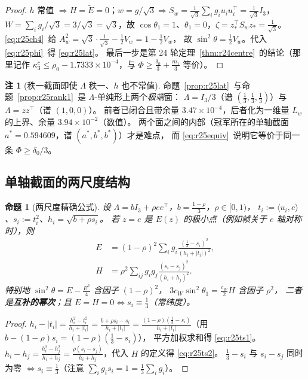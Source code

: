 \documentclass[UTF8,11pt]{ctexart}
\newtheorem{proposition}[theorem]{命题}
\theoremstyle{definition}
\newtheorem{remark}[theorem]{注}
\newcommand{\Lam}{\Lambda}
\begin{document}
\begin{proof}
$h$ 常值 $\Rightarrow H=\widetilde E=0$；$w=g/\sqrt3\Rightarrow S_w=\frac1{\sqrt3}\sum_ig_iu_iu_i^\top=\frac1{\sqrt3}I_3$，
$W=\sum_ig_i/\sqrt3=3/\sqrt3=\sqrt3$，故 $\cos\theta_1=1$、$\theta_1=0$，$\zeta=z_*^\top S_wz_*=\frac1{\sqrt3}$。
\eqref{eq:r25ch4}~给 $A_w^2=\sqrt3\cdot\frac1{\sqrt3}-\frac12V_w=1-\frac12V_w$，
故 $\sin^2\theta=\frac12V_w$。代入 \eqref{eq:r25phi}~得 \eqref{eq:r25lat}。
最后一步是第 24 轮定理~\ref{thm:r24centre}~的结论（那里记作
$\kappa_3^c\le\rho_0-1.7333\times10^{-4}$，与 $\Phi\ge\frac{\delta_0}3+\frac{m_1}3$ 等价）。
\end{proof}

\begin{remark}[秩一截面即使 $\Lam$ 秩一、$h$ 也不常值]\label{rem:r25lat2}
命题~\ref{prop:r25lat}~与命题~\ref{prop:r25rank1}~是 $\Lam$-单纯形上两个\emph{极端}面：
$\Lam=I_3/3$（谱 $(\frac13,\frac13,\frac13)$）与 $\Lam=zz^\top$（谱 $(1,0,0)$）。
前者已闭合且带余量 $3.47\times10^{-4}$，后者化为一维量 $L_w$ 的上界、余量 $3.94\times10^{-2}$（数值）。
两个面之间的内部（冠军所在的单轴截面 $a^*=0.594609$，谱 $(a^*,b^*,b^*)$）才是难点，
而 \eqref{eq:r25equiv}~说明它等价于同一条 $\Phi\ge\delta_0/3$。
\end{remark}

\subsection{单轴截面的两尺度结构}\label{sec:r25:twoscale}

\begin{proposition}[两尺度精确公式]\label{prop:r25twoscale}
设 $\Lam=bI_3+\rho ee^\top$，$b=\frac{1-\rho}3$，$\rho\in[0,1)$，
$t_i:=\langle u_i,e\rangle$、$s_i:=t_i^2$、$h_i=\sqrt{b+\rho s_i}$。
若 $z=e$ 是 $E(z)$ 的极小点（例如帧关于 $e$ 轴对称时），则
\begin{align}
E&=(1-\rho)^2\sum_ig_i\frac{(\frac13-s_i)^2}{(h_i+|t_i|)^2},\label{eq:r25ts1}\\
H&=\rho^2\sum_{ij}g_ig_j\frac{(s_i-s_j)^2}{(h_i+h_j)^2}.\label{eq:r25ts2}
\end{align}
特别地 $\sin^2\theta=E-\frac{E^2}4$ 含因子 $(1-\rho)^2$，
$3c_W\sin^2\theta_1=\frac{c_W}2H$ 含因子 $\rho^2$，
二者是\textbf{互补的幂次}；且 $E=H=0\iff s_i\equiv\frac13$（常纬度）。
\end{proposition}

\begin{proof}
$h_i-|t_i|=\frac{h_i^2-t_i^2}{h_i+|t_i|}=\frac{b+\rho s_i-s_i}{h_i+|t_i|}
=\frac{(1-\rho)(\frac13-s_i)}{h_i+|t_i|}$（用 $b-(1-\rho)s_i=(1-\rho)(\frac13-s_i)$），
平方加权求和得 \eqref{eq:r25ts1}。
$h_i-h_j=\frac{h_i^2-h_j^2}{h_i+h_j}=\frac{\rho(s_i-s_j)}{h_i+h_j}$，代入 $H$ 的定义得 \eqref{eq:r25ts2}。
$\frac13-s_i$ 与 $s_i-s_j$ 同时为零 $\iff s_i\equiv\frac13$（注意 $\sum_ig_is_i=1=\frac13\sum_ig_i$）。
\end{proof}
\end{document}
